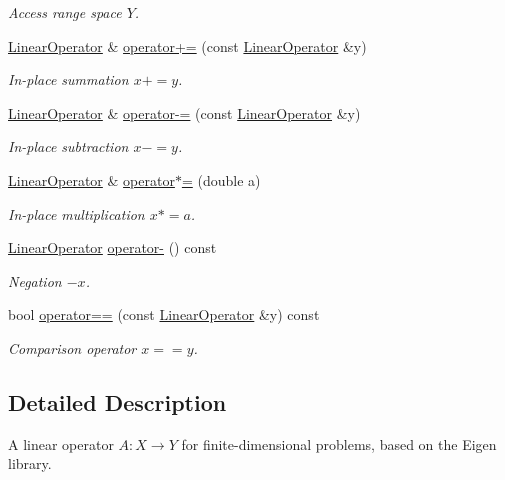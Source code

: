 \begin{DoxyCompactItemize}
\begin{DoxyCompactList}\small\item\em Access range space $Y$. \end{DoxyCompactList}\item 
\hyperlink{classSpacy_1_1Rn_1_1LinearOperator}{Linear\+Operator} \& \hyperlink{classSpacy_1_1AddArithmeticOperators_afad1d01e1e8c6f75290ac46d9b047ea8}{operator+=} (const \hyperlink{classSpacy_1_1Rn_1_1LinearOperator}{Linear\+Operator} \&y)
\begin{DoxyCompactList}\small\item\em In-\/place summation $ x+=y$. \end{DoxyCompactList}\item 
\hyperlink{classSpacy_1_1Rn_1_1LinearOperator}{Linear\+Operator} \& \hyperlink{classSpacy_1_1AddArithmeticOperators_a9fa91e177d13203cfe8cfa991c64ca36}{operator-\/=} (const \hyperlink{classSpacy_1_1Rn_1_1LinearOperator}{Linear\+Operator} \&y)
\begin{DoxyCompactList}\small\item\em In-\/place subtraction $ x-=y$. \end{DoxyCompactList}\item 
\hyperlink{classSpacy_1_1Rn_1_1LinearOperator}{Linear\+Operator} \& \hyperlink{classSpacy_1_1AddArithmeticOperators_a1d3db95b24fd2bc1de712c9e04c47e2f}{operator$\ast$=} (double a)
\begin{DoxyCompactList}\small\item\em In-\/place multiplication $ x*=a$. \end{DoxyCompactList}\item 
\hyperlink{classSpacy_1_1Rn_1_1LinearOperator}{Linear\+Operator} \hyperlink{classSpacy_1_1AddArithmeticOperators_a5acd030bf265d130983fd6e3c5b68be5}{operator-\/} () const
\begin{DoxyCompactList}\small\item\em Negation $ -x$. \end{DoxyCompactList}\item 
bool \hyperlink{classSpacy_1_1AddArithmeticOperators_a5ff1909f49f4a705d69663dc2d4b6316}{operator==} (const \hyperlink{classSpacy_1_1Rn_1_1LinearOperator}{Linear\+Operator} \&y) const
\begin{DoxyCompactList}\small\item\em Comparison operator $ x==y$. \end{DoxyCompactList}\end{DoxyCompactItemize}


\subsection{Detailed Description}
A linear operator $A:X\rightarrow Y$ for finite-\/dimensional problems, based on the Eigen library. 

